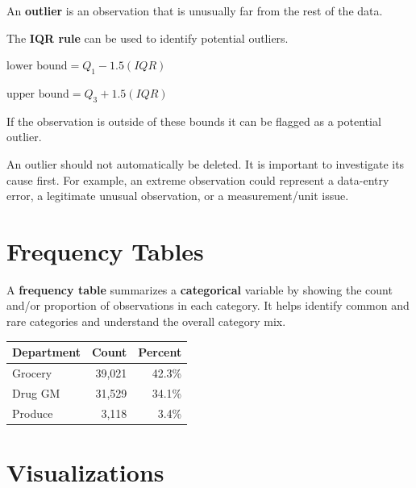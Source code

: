 \documentclass[
  letterpaper,
  DIV=11,
  numbers=noendperiod]{scrreprt}
\newcounter{none} %
\begin{document}
An \textbf{outlier} is an observation that is unusually far from the
rest of the data.

The \textbf{IQR rule} can be used to identify potential outliers.

\(\text{lower bound}=Q_1-1.5(IQR)\)

\(\text{upper bound}=Q_3+1.5(IQR)\)

If the observation is outside of these bounds it can be flagged as a
potential outlier.

An outlier should not automatically be deleted. It is important to
investigate its cause first. For example, an extreme observation could
represent a data-entry error, a legitimate unusual observation, or a
measurement/unit issue.

\section{Frequency Tables}\label{frequency-tables}

A \textbf{frequency table} summarizes a \textbf{categorical} variable by
showing the count and/or proportion of observations in each category. It
helps identify common and rare categories and understand the overall
category mix.

{\def\LTcaptype{none} %
\begin{longtable}[]{@{}lrr@{}}
\toprule\noalign{}
Department & Count & Percent \\
\midrule\noalign{}
\endhead
\bottomrule\noalign{}
\endlastfoot
Grocery & 39,021 & 42.3\% \\
Drug GM & 31,529 & 34.1\% \\
Produce & 3,118 & 3.4\% \\
\end{longtable}
}

\section{Visualizations}\label{visualizations}
\end{document}

